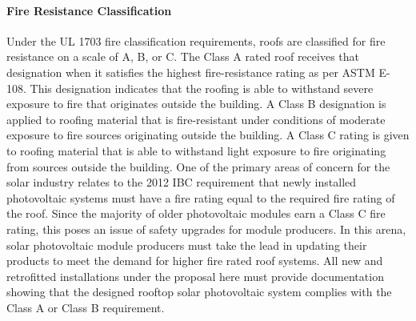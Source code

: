 \paragraph{Fire Resistance Classification}
Under the UL 1703 fire classification requirements, roofs are classified for fire resistance on a scale of A, B, or C. The Class A rated roof receives that designation when it satisfies the highest fire-resistance rating as per ASTM E-108. This designation indicates that the roofing is able to withstand severe exposure to fire that originates outside the building. A Class B designation is applied to roofing material that is fire-resistant under conditions of moderate exposure to fire sources originating outside the building. A Class C rating is given to roofing material that is able to withstand light exposure to fire originating from sources outside the building. One of the primary areas of concern for the solar industry relates to the 2012 IBC requirement that newly installed photovoltaic systems must have a fire rating equal to the required fire rating of the roof. Since the majority of older photovoltaic modules earn a Class C fire rating, this poses an issue of safety upgrades for module producers. In this arena, solar photovoltaic module producers must take the lead in updating their products to meet the demand for higher fire rated roof systems. All new and retrofitted installations under the proposal here must provide documentation showing that the designed rooftop solar photovoltaic system complies with the Class A or Class B requirement.


